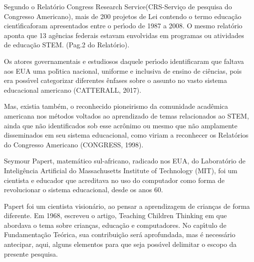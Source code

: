 \documentclass[
12pt,		%
openright,	%
twoside,  %
a4paper,			%
chapter=TITLE,		%
english,			%
french,				%
spanish,			%
brazil				%
]{USPSC-classe/USPSC}
\begin{document}
Segundo o Relat\'orio \textquotedbl Congress Research Service\textquotedbl  (CRS-Servi\c{c}o de pesquisa do Congresso Americano), mais de 200 projetos de Lei contendo o termo \textquotedbl educa\c{c}\~ao cient\'{\i}fica\textquotedbl  foram apresentados entre o per\'{\i}odo de 1987 a 2008. O mesmo relat\'orio aponta que 13 ag\^encias federais estavam envolvidas em programas ou atividades de educa\c{c}\~ao \textquotedbl STEM\textquotedbl . (Pag.2 do Relat\'orio).









Os atores governamentais e estudiosos daquele per\'{\i}odo identificaram que faltava aos EUA uma pol\'{\i}tica nacional, uniforme e inclusiva de ensino de ci\^encias, pois era poss\'{\i}vel categorizar diferentes \^enfases sobre o assunto no vasto sistema educacional americano (CATTERALL, 2017).









Mas, existia tamb\'em, o reconhecido pioneirismo da comunidade acad\^emica americana nos m\'etodos voltados ao aprendizado de temas relacionados ao STEM, ainda que n\~ao identificados sob esse acr\^onimo ou mesmo que n\~ao amplamente disseminados em seu sistema educacional, como viriam a reconhecer os Relat\'orios do Congresso Americano (CONGRESS, 1998).









Seymour Papert, matem\'atico sul-africano, radicado nos EUA, do Laborat\'orio de Intelig\^encia Artificial do Massachusetts Institute of Technology (MIT), foi um  cientista e educador que acreditava  no  uso do computador como forma de revolucionar o sistema  educacional,  desde os anos 60.









Papert foi um cientista vision\'ario, ao pensar a aprendizagem de crian\c{c}as de forma diferente. Em 1968, escreveu o artigo, \textquotedbl  Teaching Children Thinking \textquotedbl   em que abordava  o tema sobre crian\c{c}as, educa\c{c}\~ao e computadores. No cap\'{\i}tulo de Fundamenta\c{c}\~ao Te\'orica, sua contribui\c{c}\~ao ser\'a aprofundada, mas \'e necess\'ario antecipar, aqui, alguns elementos para que seja poss\'{\i}vel delimitar o escopo da presente pesquisa.
\end{document}
